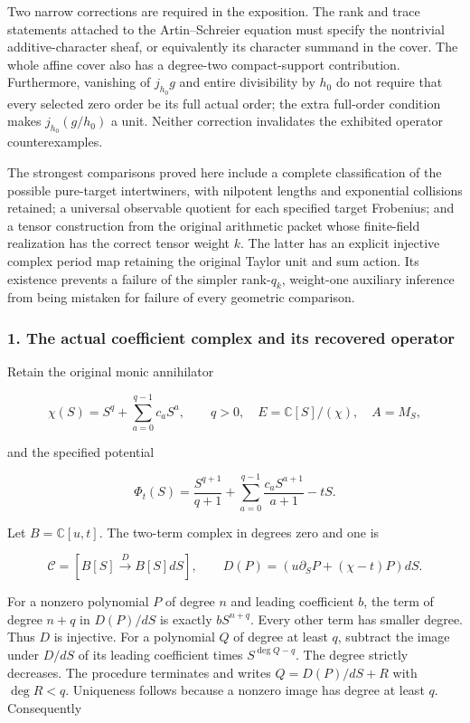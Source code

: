 \documentclass{article}
\begin{document}
Two narrow corrections are required in the exposition. The rank and trace statements attached to the Artin--Schreier equation must specify the nontrivial additive-character sheaf, or equivalently its character summand in the cover. The whole affine cover also has a degree-two compact-support contribution. Furthermore, vanishing of \(j_{h_0}g\) and entire divisibility by \(h_0\) do not require that every selected zero order be its full actual order; the extra full-order condition makes \(j_{h_0}(g/h_0)\) a unit. Neither correction invalidates the exhibited operator counterexamples.

The strongest comparisons proved here include a complete classification of the possible pure-target intertwiners, with nilpotent lengths and exponential collisions retained; a universal observable quotient for each specified target Frobenius; and a tensor construction from the original arithmetic packet whose finite-field realization has the correct tensor weight \(k\). The latter has an explicit injective complex period map retaining the original Taylor unit and sum action. Its existence prevents a failure of the simpler rank-\(q_k\), weight-one auxiliary inference from being mistaken for failure of every geometric comparison.

\subsubsection{1. The actual coefficient complex and its recovered operator}\label{endpoint-purity_review--the-actual-coefficient-complex-and-its-recovered-operator}

Retain the original monic annihilator

\[
\chi(S)=S^q+\sum_{a=0}^{q-1}c_aS^a,\qquad q>0,
\quad E=\mathbb C[S]/(\chi),\quad A=M_S,
\]

and the specified potential

\[
\Phi_t(S)=\frac{S^{q+1}}{q+1}
 +\sum_{a=0}^{q-1}\frac{c_aS^{a+1}}{a+1}-tS.
\tag{DP.1}
\]

Let \(B=\mathbb C[u,t]\). The two-term complex in degrees zero and one is

\[
\mathcal C=[B[S]\xrightarrow{D}B[S]dS],\qquad
D(P)=(u\partial_SP+(\chi-t)P)dS.
\tag{DP.2}
\]

For a nonzero polynomial \(P\) of degree \(n\) and leading coefficient \(b\), the term of degree \(n+q\) in \(D(P)/dS\) is exactly \(bS^{n+q}\). Every other term has smaller degree. Thus \(D\) is injective. For a polynomial \(Q\) of degree at least \(q\), subtract the image under \(D/dS\) of its leading coefficient times \(S^{\deg Q-q}\). The degree strictly decreases. The procedure terminates and writes \(Q=D(P)/dS+R\) with \(\deg R<q\). Uniqueness follows because a nonzero image has degree at least \(q\). Consequently
\end{document}

